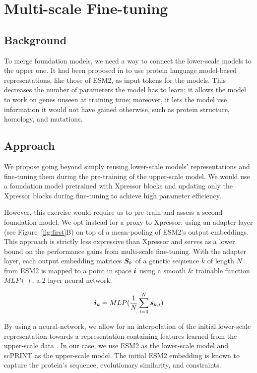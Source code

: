 \section{Multi-scale Fine-tuning}

\subsection{Background}
To merge foundation models, we need a way to connect the lower-scale models to the upper one. It had been proposed in \citet{rosenUniversalCellEmbeddings2023, scprint} to use protein language model-based representations, like those of \gls{ESM}2, as input tokens for the models. This decreases the number of parameters the model has to learn; it allows the model to work on genes unseen at training time; moreover, it lets the model use information it would not have gained otherwise, such as protein structure, homology, and mutations.

\subsection{Approach}
We propose going beyond simply reusing lower-scale models' representations and fine-tuning them during the pre-training of the upper-scale model. We would use a foundation model pretrained with Xpressor blocks and updating only the Xpressor blocks during fine-tuning to achieve high parameter efficiency.

However, this exercise would require us to pre-train and assess a second foundation model. We opt instead for a proxy to Xpressor: using an adapter layer (see Figure~\ref{fig:first}B) on top of a mean-pooling of \gls{ESM}2's output embeddings. This approach is strictly less expressive than Xpressor and serves as a lower bound on the performance gains from multi-scale fine-tuning. With the adapter layer, each output embedding matrices ${\bm{S}}_k$ of a genetic sequence $k$ of length $N$ from \gls{ESM}2 is mapped to a point in space ${\bm{i}}$ using a smooth \& trainable function $MLP()$, a 2-layer neural-network:

\begin{equation}
{\bm{i}}_{k} = MLP(\frac{1}{N}\sum_{i=0}^{N}{\bm{s}}_{k,i})
\label{eq:adapter}
\end{equation}

By using a neural-network, we allow for an interpolation of the initial lower-scale representation towards a representation containing features learned from the upper-scale data \citep{constantinescuApproximationInterpolationDeep2024}.
In our case, we use \gls{ESM}2 as the lower-scale model and scPRINT as the upper-scale model. The initial \gls{ESM}2 embedding is known to capture the protein's sequence, evolutionary similarity, and constraints.

